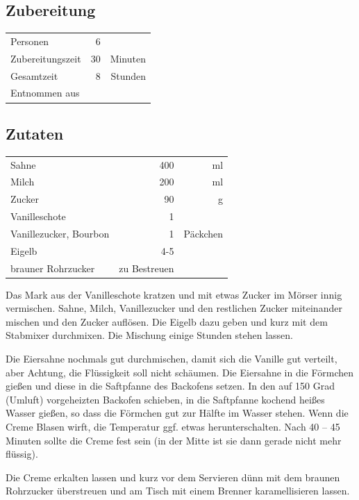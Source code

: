 \subsection*{Zubereitung}
\begin{tabular}{lrr}
	Personen         &                        6 &  \\
	Zubereitungszeit &                       30 & Minuten \\
	Gesamtzeit       &                        8 & Stunden \\
	Entnommen aus    & \cite{Cre2015} &
\end{tabular} 

\subsection*{Zutaten}
\begin{tabular}{lrr}
	Sahne                  &          400 &       ml \\
	Milch                  &          200 &       ml \\
	Zucker                 &           90 &        g \\
	Vanilleschote          &            1 &  \\
	Vanillezucker, Bourbon &            1 & Päckchen \\
	Eigelb                 &          4-5 &  \\
	brauner Rohrzucker     & zu Bestreuen &
\end{tabular} 

Das Mark aus der Vanilleschote kratzen und mit etwas Zucker im Mörser innig vermischen. Sahne, Milch, Vanillezucker und den restlichen Zucker miteinander mischen und den Zucker auflösen. Die Eigelb dazu geben und kurz mit dem Stabmixer durchmixen. Die Mischung einige Stunden stehen lassen.

Die Eiersahne nochmals gut durchmischen, damit sich die Vanille gut verteilt, aber Achtung, die Flüssigkeit soll nicht schäumen. Die Eiersahne in die Förmchen gießen und diese in die Saftpfanne des Backofens setzen. In den auf 150 Grad (Umluft) vorgeheizten Backofen schieben, in die Saftpfanne kochend heißes Wasser gießen, so dass die Förmchen gut zur Hälfte im Wasser stehen. Wenn die Creme Blasen wirft, die Temperatur ggf. etwas herunterschalten. Nach 40 – 45 Minuten sollte die Creme fest sein (in der Mitte ist sie dann gerade nicht mehr flüssig).

Die Creme erkalten lassen und kurz vor dem Servieren dünn mit dem braunen Rohrzucker überstreuen und am Tisch mit einem Brenner karamellisieren lassen.

